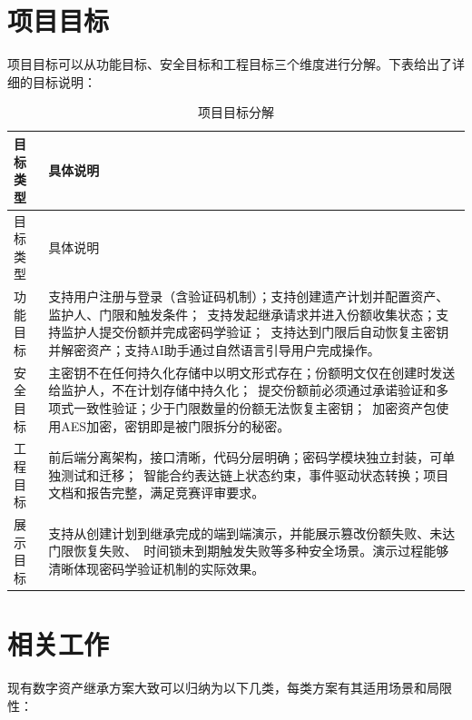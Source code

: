 \documentclass[UTF8,a4paper,zihao=-4,openany]{ctexrep}
\begin{document}
\section{项目目标}

项目目标可以从功能目标、安全目标和工程目标三个维度进行分解。下表给出了详细的目标说明：

\setlength{\extrarowheight}{4pt}
\begin{longtable}{p{3cm}p{11.4cm}}
\caption{项目目标分解}\\
\toprule
目标类型 & 具体说明\\
\midrule
\endfirsthead
\toprule
目标类型 & 具体说明\\
\midrule
\endhead
功能目标 & 支持用户注册与登录（含验证码机制）；支持创建遗产计划并配置资产、监护人、门限和触发条件；\ 支持发起继承请求并进入份额收集状态；支持监护人提交份额并完成密码学验证；\ 支持达到门限后自动恢复主密钥并解密资产；支持AI助手通过自然语言引导用户完成操作。\\
安全目标 & 主密钥不在任何持久化存储中以明文形式存在；份额明文仅在创建时发送给监护人，不在计划存储中持久化；\ 提交份额前必须通过承诺验证和多项式一致性验证；少于门限数量的份额无法恢复主密钥；\ 加密资产包使用AES加密，密钥即是被门限拆分的秘密。\\
工程目标 & 前后端分离架构，接口清晰，代码分层明确；密码学模块独立封装，可单独测试和迁移；\ 智能合约表达链上状态约束，事件驱动状态转换；项目文档和报告完整，满足竞赛评审要求。\\
展示目标 & 支持从创建计划到继承完成的端到端演示，并能展示篡改份额失败、未达门限恢复失败、\ 时间锁未到期触发失败等多种安全场景。演示过程能够清晰体现密码学验证机制的实际效果。\\
\bottomrule
\end{longtable}

\section{相关工作}

现有数字资产继承方案大致可以归纳为以下几类，每类方案有其适用场景和局限性：
\end{document}
